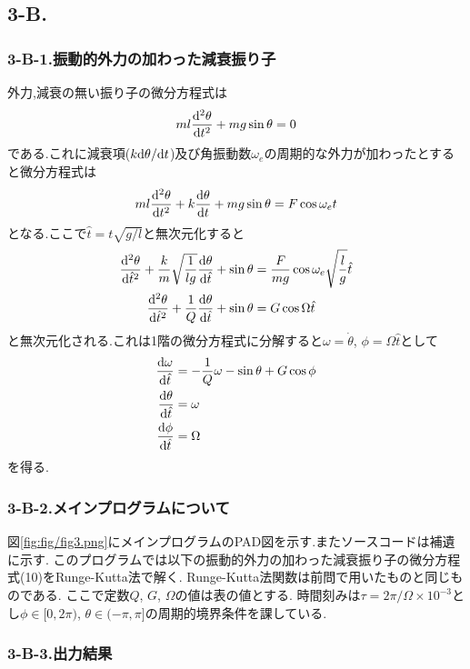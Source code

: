\subsection*{3-B.}
\subsubsection*{3-B-1.振動的外力の加わった減衰振り子}
外力,減衰の無い振り子の微分方程式は
\begin{align}
  ml\frac{{\rm d}^2\theta}{{\rm d}t^2}+mg\sin \theta=0
\end{align}
である.これに減衰項($k{\rm d}\theta/{\rm d}t$)及び角振動数$\omega_e$の周期的な外力が加わったとすると微分方程式は
\begin{align}
  ml\frac{{\rm d}^2\theta}{{\rm d}t^2}+k\frac{{\rm d}\theta}{{\rm d}t}+mg\sin \theta=F\cos\omega_et
\end{align}
となる.ここで$\hat{t}=t\sqrt{g/l}$と無次元化すると
\begin{align}
  \begin{split}
    \frac{{\rm d}^2\theta}{{\rm d}\hat{t}^2}+\frac{k}{m}\sqrt{\frac{1}{lg}}\frac{{\rm d}\theta}{{\rm d}\hat{t}}+\sin\theta&=\frac{F}{mg}\cos\omega_e\sqrt{\frac{l}{g}}\hat{t}\\
    \frac{{\rm d}^2\theta}{{\rm d}\hat{t}^2}+\frac{1}{Q}\frac{{\rm d}\theta}{{\rm d}\hat{t}}+\sin\theta&=G\cos\Omega\hat{t}
  \end{split}
\end{align}
と無次元化される.これは1階の微分方程式に分解すると$\omega=\dot{\theta}$, $\phi=\Omega\hat{t}$として
\begin{align}
  \begin{split}
    \frac{{\rm d}\omega}{{\rm d}\hat{t}}&=-\frac{1}{Q}\omega-\sin\theta+G\cos\phi\\
    \frac{{\rm d}\theta}{{\rm d}\hat{t}}&=\omega\\
    \frac{{\rm d}\phi}{{\rm d}\hat{t}}&=\Omega
  \end{split}
\end{align}
を得る.
\subsubsection*{3-B-2.メインプログラムについて}
図\ref{fig:fig/fig3.png}にメインプログラムのPAD図を示す.またソースコードは補遺に示す.
このプログラムでは以下の振動的外力の加わった減衰振り子の微分方程式(10)をRunge-Kutta法で解く.
Runge-Kutta法関数は前問で用いたものと同じものである.
ここで定数$Q$, $G$, $\Omega$の値は表の値とする.
時間刻みは$\tau=2\pi/\Omega\times10^{-3}$とし$\phi\in[0,2\pi)$, $\theta\in(-\pi,\pi]$の周期的境界条件を課している.
\subsubsection*{3-B-3.出力結果}